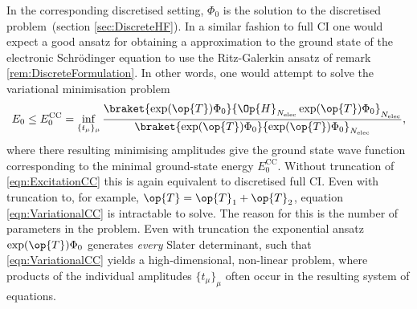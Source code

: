 In the corresponding discretised setting,
$\Phi_0$ is the solution to the discretised
\HF problem~(section \vref{sec:DiscreteHF}).
In a similar fashion to full CI one would expect
a good ansatz for obtaining a \CC approximation to
the ground state of the electronic Schrödinger equation
to use the Ritz-Galerkin ansatz of remark \vref{rem:DiscreteFormulation}.
In other words, one would attempt to solve the variational minimisation problem
\begin{equation}
E_0 \leq E_0^\text{CC} = \inf_{\{t_\mu\}_{\mu}} \frac{\braket{\exp(\op{T}) \Phi_0}{\Op{H}_{\Nelec} \exp(\op{T}) \Phi_0}_{\Nelec}}
	{\braket{\exp(\op{T}) \Phi_0}{\exp(\op{T}) \Phi_0}_{\Nelec}},
	\label{eqn:VariationalCC}
\end{equation}
where there resulting minimising amplitudes give the \CC ground state
wave function corresponding to the minimal ground-state energy $E_0^\text{CC}$.
Without truncation of \eqref{eqn:ExcitationCC}
this is again equivalent to discretised full CI.
Even with truncation to, for example, $\op{T} = \op{T}_1 + \op{T}_2$,
equation \eqref{eqn:VariationalCC} is intractable to solve.
The reason for this is the number of parameters in the problem.
Even with truncation the exponential ansatz
$\exp(\op{T}) \Phi_0$ generates \emph{every} Slater determinant,
such that \eqref{eqn:VariationalCC} yields
a high-dimensional, non-linear problem,
where products of the individual amplitudes $\{t_\mu\}_{\mu}$ often occur
in the resulting system of equations.


